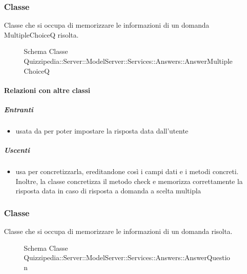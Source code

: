 \subsubsection{Classe }
Classe che si occupa di memorizzare le informazioni di un domanda MultipleChoiceQ risolta.
\begin{figure}[H]
\centering
\noindent{}
\caption[Schema Classe AnswerMultipleChoiceQ]{Schema Classe Quizzipedia::Server::ModelServer::Services::Answers::AnswerMultipleChoiceQ}
\end{figure}
\paragraph{Relazioni con altre classi}
\subparagraph{Entranti}
\begin{itemize}
\item usata da  per poter impostare la risposta data dall'utente
\end{itemize}
\subparagraph{Uscenti}
\begin{itemize}
\item usa  per concretizzarla, ereditandone così i campi dati e i metodi concreti. Inoltre, la classe concretizza il metodo check e memorizza correttamente la risposta data in caso di risposta a domanda a scelta multipla
\end{itemize}
\subsubsection{Classe }
Classe che si occupa di memorizzare le informazioni di un domanda risolta.
\begin{figure}[H]
\centering
\noindent{}
\caption[Schema Classe AnswerQuestion]{Schema Classe Quizzipedia::Server::ModelServer::Services::Answers::AnswerQuestion}
\end{figure}
